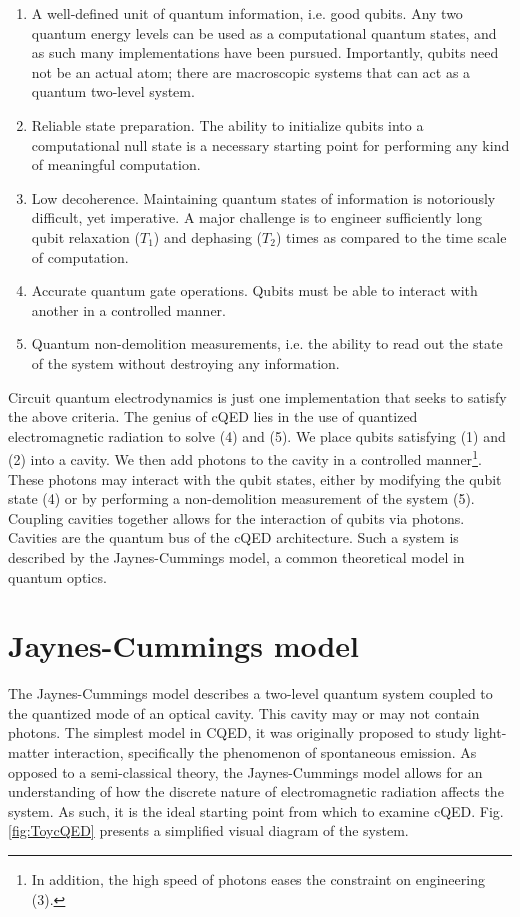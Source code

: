 \documentclass[11 pt, oneside]{book} %
\begin{document}
\begin{enumerate}
\item A well-defined unit of quantum information, i.e. good qubits. Any two quantum energy levels can be used as a computational quantum states, and as such many implementations have been pursued. Importantly, qubits need not be an actual atom; there are macroscopic systems that can act as a quantum two-level system. 
\item Reliable state preparation. The ability to initialize qubits into a computational null state is a necessary starting point for performing any kind of meaningful computation.
\item Low decoherence. Maintaining quantum states of information is notoriously difficult, yet imperative.  A major challenge is to engineer sufficiently long qubit relaxation ($T_1$) and dephasing ($T_2$) times as compared to the time scale of computation. 
\item Accurate quantum gate operations. Qubits must be able to interact with another in a controlled manner. 
\item Quantum non-demolition  measurements, i.e. the ability to read out the state of the system without destroying any information. 
\end{enumerate}

Circuit quantum electrodynamics is just one implementation that seeks to satisfy the above criteria. The genius of cQED lies in the use of quantized electromagnetic radiation to solve (4) and (5). We place qubits satisfying (1) and (2) into a cavity. We then add photons to the cavity in a controlled manner\footnote{In addition, the high speed of photons eases the constraint on engineering (3).}. These photons may interact with the qubit states, either by modifying the qubit state (4) or by performing a non-demolition measurement of the system (5). Coupling cavities together allows for the interaction of qubits via photons. Cavities are the quantum bus of the cQED architecture. Such a system is described by the Jaynes-Cummings model, a common theoretical model in quantum optics. 



\section{Jaynes-Cummings model}\label{sec:JC}
The Jaynes-Cummings model describes a two-level quantum system coupled to the quantized mode of an optical cavity. This cavity may or may not contain photons. The simplest model in CQED, it was originally proposed to study light-matter interaction, specifically the phenomenon of spontaneous emission. As opposed to a semi-classical theory, the Jaynes-Cummings model allows for an understanding of how the discrete nature of electromagnetic radiation affects the system. As such, it is the ideal starting point from which to examine cQED. Fig. \ref{fig:ToycQED} presents a simplified visual diagram of the system.
\end{document}
